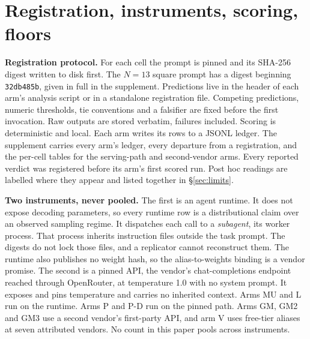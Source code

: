 \section{Registration, instruments, scoring, floors}\label{sec:method}

\textbf{Registration protocol.} For each cell the prompt is pinned and its SHA-256 digest
written to disk first. The $N = 13$ square prompt has a digest beginning \texttt{32db485b},
given in full in the supplement. Predictions live in the header of each arm's analysis script or in
a standalone registration file. Competing predictions, numeric thresholds, tie conventions and
a falsifier are fixed before the first invocation. Raw outputs are stored verbatim, failures
included. Scoring is deterministic and local. Each arm writes its rows to a JSONL ledger.
The supplement carries every arm's ledger, every departure from a registration, and the
per-cell tables for the serving-path and second-vendor arms. Every reported verdict was
registered before its arm's first scored run. Post hoc readings are labelled where they
appear and listed together in \S\ref{sec:limits}.

\textbf{Two instruments, never pooled.} The first is an agent runtime. It does not expose
decoding parameters, so every runtime row is a distributional claim over an observed sampling
regime. It dispatches each call to a \emph{subagent}, its worker process. That process
inherits instruction files outside the task prompt. The digests do not lock those files, and
a replicator cannot reconstruct them. The runtime also publishes no weight hash, so the
alias-to-weights binding is a vendor promise. The second is a pinned API, the vendor's
chat-completions endpoint reached through OpenRouter, at temperature 1.0 with no system
prompt. It exposes and pins temperature and carries no inherited context. Arms MU and L run
on the runtime. Arms P and P-D run on the pinned path. Arms GM, GM2 and GM3 use a second
vendor's first-party API, and arm V uses free-tier aliases at seven attributed vendors. No
count in this paper pools across instruments.


